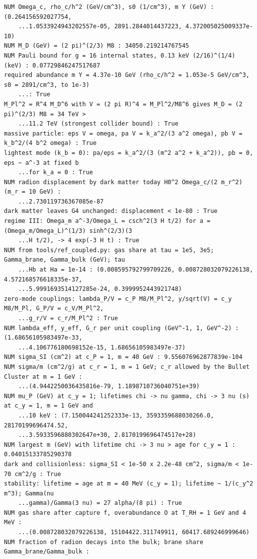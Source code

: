 \documentclass[10pt,a4paper]{article}
\begin{document}
\begin{Verbatim}[fontsize=\small,frame=single,framesep=2mm]
NUM Omega_c, rho_c/h^2 (GeV/cm^3), s0 (1/cm^3), m Y (GeV) : (0.264156592027754,
    ...1.0533924943202557e-05, 2891.2844014437223, 4.372005025009337e-10)
NUM M_D (GeV) = (2 pi)^(2/3) M8 : 34050.219214767545
NUM Pauli bound for g = 16 internal states, 0.13 keV (2/16)^(1/4) (keV) : 0.07729846247517687
required abundance m Y = 4.37e-10 GeV (rho_c/h^2 = 1.053e-5 GeV/cm^3, s0 = 2891/cm^3, to 1e-3)
    ...: True
M_Pl^2 = R^4 M_D^6 with V = (2 pi R)^4 = M_Pl^2/M8^6 gives M_D = (2 pi)^(2/3) M8 = 34 TeV >
    ...11.2 TeV (strongest collider bound) : True
massive particle: eps V = omega, pa V = k_a^2/(3 a^2 omega), pb V = k_b^2/(4 b^2 omega) : True
lightest mode (k_b = 0): pa/eps = k_a^2/(3 (m^2 a^2 + k_a^2)), pb = 0, eps ~ a^-3 at fixed b
    ...for k_a = 0 : True
NUM radion displacement by dark matter today H0^2 Omega_c/(2 m_r^2) (m_r = 10 GeV) :
    ...2.730119736367085e-87
dark matter leaves G4 unchanged: displacement < 1e-80 : True
regime III: Omega_m a^-3/Omega_L = csch^2(3 H t/2) for a = (Omega_m/Omega_L)^(1/3) sinh^(2/3)(3
    ...H t/2), -> 4 exp(-3 H t) : True
NUM from tools/ref_coupled.py: gas share at tau = 1e5, 3e5; Gamma_brane, Gamma_bulk (GeV); tau
    ...Hb at Ha = 1e-14 : (0.008595792799709226, 0.008728032079226138, 4.572168576618335e-37,
    ...5.9991693514127285e-24, 0.3999952443921748)
zero-mode couplings: lambda_P/V = c_P M8/M_Pl^2, y/sqrt(V) = c_y M8/M_Pl, G_P/V = c_V/M_Pl^2,
    ...g_r/V = c_r/M_Pl^2 : True
NUM lambda_eff, y_eff, G_r per unit coupling (GeV^-1, 1, GeV^-2) : (1.68656105983497e-33,
    ...4.106776180698152e-15, 1.68656105983497e-37)
NUM sigma_SI (cm^2) at c_P = 1, m = 40 GeV : 9.556076962877839e-104
NUM sigma/m (cm^2/g) at c_r = 1, m = 1 GeV; c_r allowed by the Bullet Cluster at m = 1 GeV :
    ...(4.9442250036435816e-79, 1.1898710736040751e+39)
NUM mu_P (GeV) at c_y = 1; lifetimes chi -> nu gamma, chi -> 3 nu (s) at c_y = 1, m = 1 GeV and
    ...10 keV : (7.150044241252333e-13, 3593359688030266.0, 28170199696474.52,
    ...3.5933596880302647e+30, 2.8170199696474517e+28)
NUM largest m (GeV) with lifetime chi -> 3 nu > age for c_y = 1 : 0.04015133785290378
dark and collisionless: sigma_SI < 1e-50 x 2.2e-48 cm^2, sigma/m < 1e-70 cm^2/g : True
stability: lifetime = age at m = 40 MeV (c_y = 1); lifetime ~ 1/(c_y^2 m^3); Gamma(nu
    ...gamma)/Gamma(3 nu) = 27 alpha/(8 pi) : True
NUM gas share after capture f, overabundance O at T_RH = 1 GeV and 4 MeV :
    ...(0.008728032079226138, 15104422.311749911, 60417.689246999646)
NUM fraction of radion decays into the bulk; brane share Gamma_brane/Gamma_bulk :

\end{Verbatim}
\end{document}
